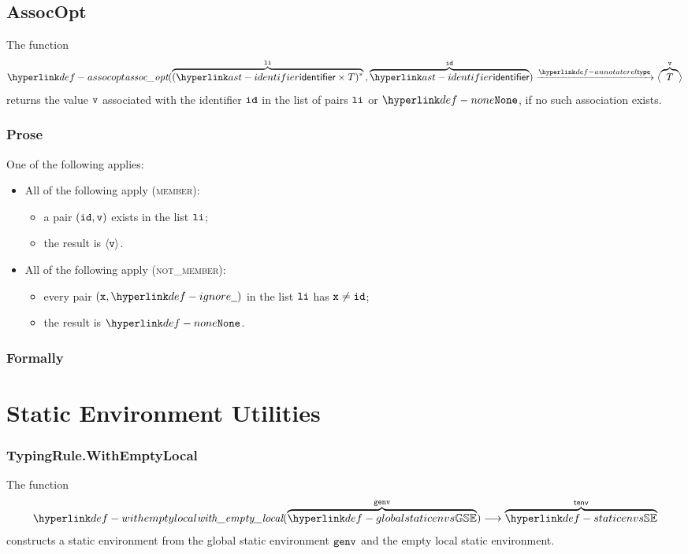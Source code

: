 \subsection{AssocOpt}
\hypertarget{def-assocopt}{}
The function
\[
  \assocopt(\overname{(\identifier\times T)^*}{\vli} \aslsep \overname{\identifier}{\id}) \typearrow \langle \overname{T}{\vv} \rangle
\]
returns the value $\texttt{v}$ associated with the identifier $\texttt{id}$ in the list of pairs $\texttt{li}$ or $\None$, if no such association exists.

\subsubsection{Prose}
One of the following applies:
\begin{itemize}
  \item All of the following apply (\textsc{member}):
  \begin{itemize}
    \item a pair $(\texttt{id},\texttt{v})$ exists in the list $\texttt{li}$;
    \item the result is $\langle\texttt{v}\rangle$.
  \end{itemize}

  \item All of the following apply (\textsc{not\_member}):
  \begin{itemize}
    \item every pair $(\vx,\Ignore)$ in the list $\texttt{li}$ has $\texttt{x}\neq\texttt{id}$;
    \item the result is $\None$.
  \end{itemize}
\end{itemize}

\subsubsection{Formally}

\section{Static Environment Utilities}

\hypertarget{def-withemptylocal}{}
\subsubsection{TypingRule.WithEmptyLocal}
The function
\[
  \withemptylocal(\overname{\globalstaticenvs}{\genv})
  \aslto \overname{\staticenvs}{\tenv}
\]
constructs a static environment from the global static environment $\texttt{genv}$
and the empty local static environment.

